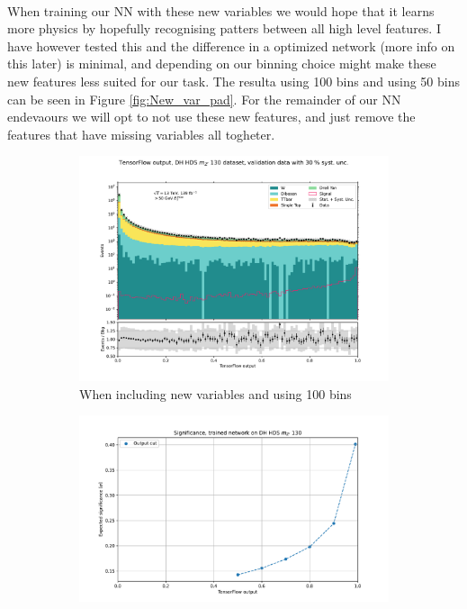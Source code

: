 \documentclass[14pt, a4paper]{book}
\begin{document}
\\When training our NN with these new variables we would hope that it learns more physics by hopefully recognising patters between all high level features. I have however tested this and the 
difference in a optimized network (more info on this later) is minimal, and depending on our binning choice might make these new features less suited for our task. The resulta using 100 bins and using 50 bins 
can be seen in Figure \ref{fig:New_var_pad}. For the remainder of our NN endevaours we will opt to not use these new features, and just remove the features that have missing variables all togheter.
\graphicspath{{../../../Plots/NeuralNetwork/FULL/padding/}}
\begin{figure}[!ht]
	\centering
	\begin{subfigure}[b]{0.49\textwidth}
      \centering
      \includegraphics[width=1\textwidth]{new_variables/finer_binning/VAL.pdf}
      \caption{When including new variables and using 100 bins}
   \end{subfigure}
   \hfill
   \begin{subfigure}[b]{0.49\textwidth}
      \centering
      \includegraphics[width=1\textwidth]{new_variables/finer_binning/EXP_SIG.pdf}

\end{subfigure}
\end{figure}
\end{document}
